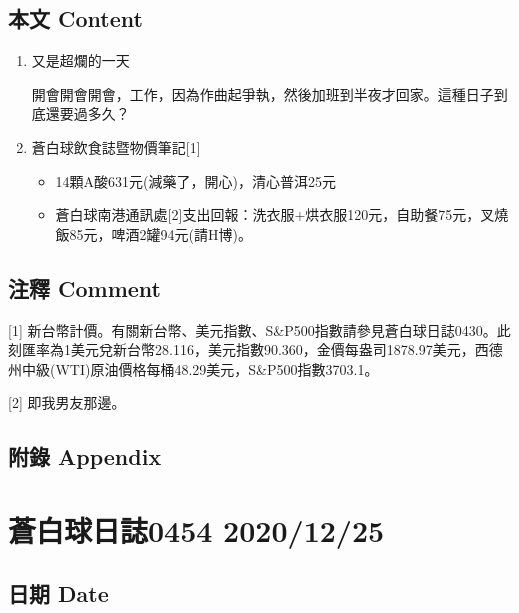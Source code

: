 \documentclass[a5paper, 11pt
]{book}
\providecommand{\tightlist}{%
  \setlength{\itemsep}{0pt}\setlength{\parskip}{0pt}}
\begin{document}
\hypertarget{ux672cux6587-content-23}{%
\subsection{本文 Content}\label{ux672cux6587-content-23}}

\begin{enumerate}
\def\labelenumi{\arabic{enumi}.}
\item
  又是超爛的一天

  開會開會開會，工作，因為作曲起爭執，然後加班到半夜才回家。這種日子到底還要過多久？
\item
  蒼白球飲食誌暨物價筆記{[}1{]}

  \begin{itemize}
  \tightlist
  \item
    14顆A酸631元(減藥了，開心)，清心普洱25元
  \item
    蒼白球南港通訊處{[}2{]}支出回報：洗衣服+烘衣服120元，自助餐75元，叉燒飯85元，啤酒2罐94元(請H博)。
  \end{itemize}
\end{enumerate}

\hypertarget{ux6ce8ux91cb-comment-23}{%
\subsection{注釋 Comment}\label{ux6ce8ux91cb-comment-23}}

{[}1{]}
新台幣計價。有關新台幣、美元指數、S\&P500指數請參見蒼白球日誌0430。此刻匯率為1美元兌新台幣28.116，美元指數90.360，金價每盎司1878.97美元，西德州中級(WTI)原油價格每桶48.29美元，S\&P500指數3703.1。

{[}2{]} 即我男友那邊。

\hypertarget{ux9644ux9304-appendix-23}{%
\subsection{附錄 Appendix}\label{ux9644ux9304-appendix-23}}

\hypertarget{ux84bcux767dux7403ux65e5ux8a8c0454-20201225}{%
\section{蒼白球日誌0454
2020/12/25}\label{ux84bcux767dux7403ux65e5ux8a8c0454-20201225}}

\hypertarget{ux65e5ux671f-date-24}{%
\subsection{日期 Date}\label{ux65e5ux671f-date-24}}
\end{document}
